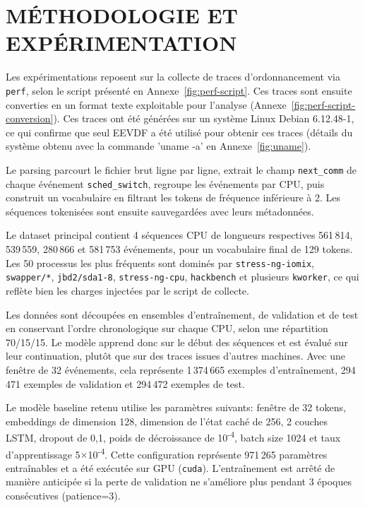 \documentclass[letterpaper, 10 pt, conference]{ieeeconf}  %
\begin{document}
\section{MÉTHODOLOGIE ET EXPÉRIMENTATION}

Les expérimentations reposent sur la collecte de traces d’ordonnancement via \texttt{perf}, selon le script présenté en Annexe~\ref{fig:perf-script}. Ces traces sont ensuite converties en un format texte exploitable pour l’analyse (Annexe~\ref{fig:perf-script-conversion}). Ces traces ont été générées sur un système Linux Debian 6.12.48-1, ce qui confirme que seul EEVDF a été utilisé pour obtenir ces traces (détails du système obtenu avec la commande 'uname -a' en Annexe~\ref{fig:uname}).

Le parsing parcourt le fichier brut ligne par ligne, extrait le champ \texttt{next\_comm} de chaque événement \texttt{sched\_switch}, regroupe les événements par CPU, puis construit un vocabulaire en filtrant les tokens de fréquence inférieure à 2. Les séquences tokenisées sont ensuite sauvegardées avec leurs métadonnées.

Le dataset principal contient 4 séquences CPU de longueurs respectives 561\,814, 539\,559, 280\,866 et 581\,753 événements, pour un vocabulaire final de 129 tokens. Les 50 processus les plus fréquents sont dominés par \texttt{stress-ng-iomix}, \texttt{swapper/*}, \texttt{jbd2/sda1-8}, \texttt{stress-ng-cpu}, \texttt{hackbench} et plusieurs \texttt{kworker}, ce qui reflète bien les charges injectées par le script de collecte.


Les données sont découpées en ensembles d’entraînement, de validation et de test en conservant l’ordre chronologique sur chaque CPU, selon une répartition 70/15/15. Le modèle apprend donc sur le début des séquences et est évalué sur leur continuation, plutôt que sur des traces issues d’autres machines. Avec une fenêtre de 32 événements, cela représente 1\,374\,665 exemples d'entraînement, 294\,471 exemples de validation et 294\,472 exemples de test.

Le modèle baseline retenu utilise les paramètres suivants: fenêtre de 32 tokens, embeddings de dimension 128, dimension de l'état caché de 256, 2 couches LSTM, dropout de 0,1, poids de décroissance de 10\textsuperscript{-4}, batch size 1024 et taux d'apprentissage 5$\times$10\textsuperscript{-4}. Cette configuration représente 971\,265 paramètres entraînables et a été exécutée sur GPU (\texttt{cuda}). L’entraînement est arrêté de manière anticipée si la perte de validation ne s’améliore plus pendant 3 époques consécutives (patience=3).
\end{document}
